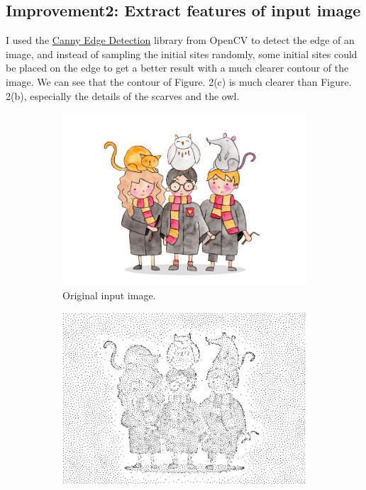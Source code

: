 \documentclass[11pt]{article}
\begin{document}
\subsection{Improvement2: Extract features of input image}
I used the \href{https://docs.opencv.org/trunk/da/d22/tutorial_py_canny.html}{Canny Edge Detection} library from OpenCV to detect the edge of an image, and instead of sampling the initial sites randomly, some initial sites could be placed on the edge to get a better result with a much clearer contour of the image. We can see that the contour of Figure. 2(c) is much clearer than Figure. 2(b), especially the details of the scarves and the owl.

\begin{figure}[h!]
	\centering
	\begin{subfigure}[b]{0.8\linewidth}
		\includegraphics[width=\linewidth]{harry2.jpg}
		\caption{Original input image.}
	\end{subfigure}
	\begin{subfigure}[b]{0.4\linewidth}
		\includegraphics[width=\linewidth]{harry2_random.png}

\end{subfigure}
\end{figure}
\end{document}
